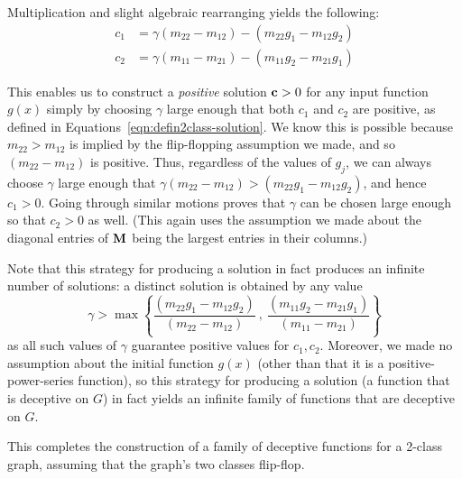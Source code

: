  Multiplication and slight algebraic rearranging yields the following:
 \begin{align}
   c_1 &= \gamma(m_{22} - m_{12}) - (m_{22}g_1 - m_{12} g_2 ) \label{eqn:defin2class-solution} \\
   c_2 &= \gamma( m_{11} - m_{21} ) - (m_{11}g_2 - m_{21}g_1)
 \end{align}

This enables us to construct a \emph{positive} solution $\textbf{c} > 0$ for any input function $g(x)$ simply by choosing $\gamma$ large enough that both $c_1$ and $c_2$ are positive, as defined in Equations~\eqref{eqn:defin2class-solution}.
We know this is possible because $m_{22}  > m_{12}$ is implied by the flip-flopping assumption we made, and so $(m_{22} - m_{12})$ is positive.
Thus, regardless of the values of $g_j$, we can always choose $\gamma$ large enough that $\gamma(m_{22} - m_{12}) > (m_{22}g_1 - m_{12} g_2 )$, and hence $c_1 > 0$.
Going through similar motions proves that $\gamma$ can be chosen large enough so that $c_2 > 0$ as well.
(This again uses the assumption we made about the diagonal entries of $\textbf{M}$ being the largest entries in their columns.)

Note that this strategy for producing a solution in fact produces an infinite number of solutions: a distinct solution is obtained by any value
\[
\gamma > \max\left\{  \frac{(m_{22}g_1 - m_{12} g_2 )}{(m_{22} - m_{12})} ~,~   \frac{(m_{11}g_2 - m_{21}g_1)}{( m_{11} - m_{21} )}  \right\}
\]
as all such values of $\gamma$ guarantee positive values for $c_1, c_2$.
Moreover, we made no assumption about the initial function $g(x)$ (other than that it is a positive-power-series function), so this strategy for producing a solution (a function that is deceptive on $G$) in fact yields an infinite family of functions that are deceptive on $G$.%

This completes the construction of a family of deceptive functions for a 2-class graph, assuming that the graph's two classes flip-flop.
